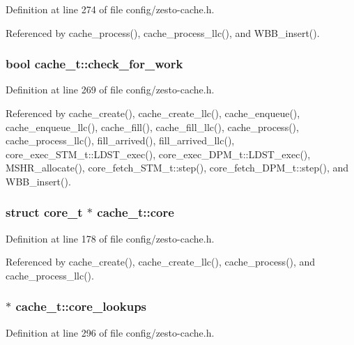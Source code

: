 Definition at line 274 of file config/zesto-cache.h.

Referenced by cache\_\-process(), cache\_\-process\_\-llc(), and WBB\_\-insert().
\subsubsection[{check\_\-for\_\-work}]{\setlength{\rightskip}{0pt plus 5cm}bool {\bf cache\_\-t::check\_\-for\_\-work}}\label{structcache__t_9b4a4bd434c4df3d4d004df6b1c362b8}




Definition at line 269 of file config/zesto-cache.h.

Referenced by cache\_\-create(), cache\_\-create\_\-llc(), cache\_\-enqueue(), cache\_\-enqueue\_\-llc(), cache\_\-fill(), cache\_\-fill\_\-llc(), cache\_\-process(), cache\_\-process\_\-llc(), fill\_\-arrived(), fill\_\-arrived\_\-llc(), core\_\-exec\_\-STM\_\-t::LDST\_\-exec(), core\_\-exec\_\-DPM\_\-t::LDST\_\-exec(), MSHR\_\-allocate(), core\_\-fetch\_\-STM\_\-t::step(), core\_\-fetch\_\-DPM\_\-t::step(), and WBB\_\-insert().
\subsubsection[{core}]{\setlength{\rightskip}{0pt plus 5cm}struct {\bf core\_\-t} $\ast$ {\bf cache\_\-t::core}\hspace{0.3cm}{\tt  [read]}}\label{structcache__t_5824ebd1e990fd25be2f43996e19648b}




Definition at line 178 of file config/zesto-cache.h.

Referenced by cache\_\-create(), cache\_\-create\_\-llc(), cache\_\-process(), and cache\_\-process\_\-llc().
\subsubsection[{core\_\-lookups}]{$\ast$ {\bf cache\_\-t::core\_\-lookups}}\label{structcache__t_ac667abbcad88a0dd01d729c919664f8}




Definition at line 296 of file config/zesto-cache.h.

